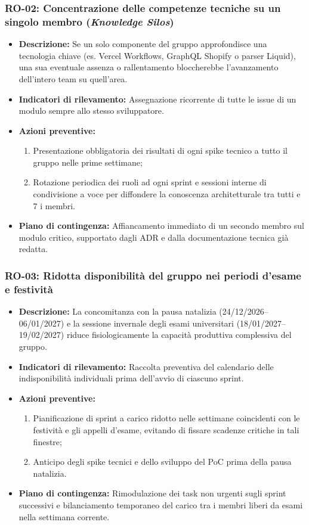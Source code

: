 \subsubsection{RO-02: Concentrazione delle competenze tecniche su un singolo membro (\textit{Knowledge Silos})}
\begin{itemize}
    \item \textbf{Descrizione:} Se un solo componente del gruppo approfondisce una tecnologia chiave (es. Vercel Workflows, GraphQL Shopify o parser Liquid), una sua eventuale assenza o rallentamento bloccherebbe l'avanzamento dell'intero team su quell'area.
    \item \textbf{Indicatori di rilevamento:} Assegnazione ricorrente di tutte le issue di un modulo sempre allo stesso sviluppatore.
    \item \textbf{Azioni preventive:}
    \begin{enumerate}
        \item Presentazione obbligatoria dei risultati di ogni spike tecnico a tutto il gruppo nelle prime settimane;
        \item Rotazione periodica dei ruoli ad ogni sprint e sessioni interne di condivisione a voce per diffondere la conoscenza architetturale tra tutti e 7 i membri.
    \end{enumerate}
    \item \textbf{Piano di contingenza:} Affiancamento immediato di un secondo membro sul modulo critico, supportato dagli ADR e dalla documentazione tecnica già redatta.
\end{itemize}

\subsubsection{RO-03: Ridotta disponibilità del gruppo nei periodi d'esame e festività}
\begin{itemize}
    \item \textbf{Descrizione:} La concomitanza con la pausa natalizia (24/12/2026--06/01/2027) e la sessione invernale degli esami universitari (18/01/2027--19/02/2027) riduce fisiologicamente la capacità produttiva complessiva del gruppo.
    \item \textbf{Indicatori di rilevamento:} Raccolta preventiva del calendario delle indisponibilità individuali prima dell'avvio di ciascuno sprint.
    \item \textbf{Azioni preventive:}
    \begin{enumerate}
        \item Pianificazione di sprint a carico ridotto nelle settimane coincidenti con le festività e gli appelli d'esame, evitando di fissare scadenze critiche in tali finestre;
        \item Anticipo degli spike tecnici e dello sviluppo del PoC prima della pausa natalizia.
    \end{enumerate}
    \item \textbf{Piano di contingenza:} Rimodulazione dei task non urgenti sugli sprint successivi e bilanciamento temporaneo del carico tra i membri liberi da esami nella settimana corrente.
\end{itemize}

